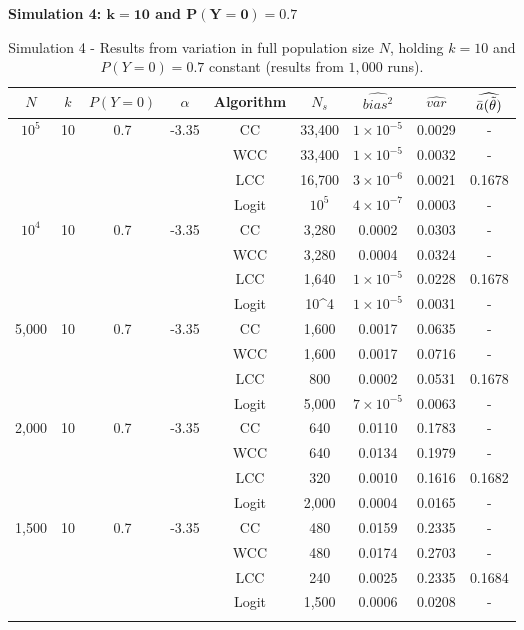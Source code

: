 \textbf{Simulation 4: $\mathbf{k=10}$ and $\mathbf{P(Y=0)=0.7}$}\\

\begin{longtable}{ccccccccc}
\toprule
$N$ & $k$ & $P(Y=0)$ & $\alpha$ & Algorithm & $N_s$ & $\widehat{bias^2}$ & $\widehat{var}$ & $\widehat{\Bar{a}(\Tilde{\theta})}$\\
\midrule
$10^5$ & 10 & 0.7 & -3.35 & CC & 33,400 & $1\times10^{-5}$ & 0.0029 & - \\
 & & & & WCC & 33,400 & $1\times10^{-5}$ & 0.0032 & - \\
 & & & & LCC & 16,700 & $3\times10^{-6}$ & 0.0021 & 0.1678\\
 & & & & Logit & $10^5$ & $4\times10^{-7}$ & 0.0003 & -\\
 \midrule
$10^4$ & 10 & 0.7 & -3.35 & CC & 3,280 & 0.0002 & 0.0303 & - \\
 & & & & WCC & 3,280 &  0.0004 & 0.0324 & - \\
 & & & & LCC & 1,640 & $1\times10^{-5}$ & 0.0228 & 0.1678 \\
 & & & & Logit & 10^4 & $1\times10^{-5}$ & 0.0031 & - \\
\midrule
5,000 & 10 & 0.7 & -3.35 & CC & 1,600 & 0.0017 & 0.0635 & - \\
 & & & & WCC & 1,600 & 0.0017 & 0.0716 & - \\
 & & & & LCC & 800 & 0.0002 & 0.0531 & 0.1678 \\
 & & & & Logit & 5,000 & $7\times10^{-5}$ & 0.0063 & - \\
 \midrule
2,000 & 10 & 0.7 & -3.35 & CC & 640 &0.0110 & 0.1783 & - \\
 & & & & WCC & 640 & 0.0134 & 0.1979 & - \\
 & & & & LCC & 320 & 0.0010 & 0.1616 & 0.1682 \\
 & & & & Logit & 2,000 & 0.0004 & 0.0165 & - \\
 \midrule
1,500 & 10 & 0.7 & -3.35 & CC & 480 & 0.0159 & 0.2335 & - \\
 & & & & WCC & 480 & 0.0174 & 0.2703 & -\\
 & & & & LCC & 240 & 0.0025 & 0.2335 & 0.1684 \\
 & & & & Logit & 1,500 & 0.0006 & 0.0208 & - \\
\bottomrule
\caption[Simulation 4 - Results from variation in full population size $N$, holding $k=10$ and $P(Y=0)=0.7$ constant]{Simulation 4 - Results from variation in full population size $N$, holding $k=10$ and $P(Y=0)=0.7$ constant (results from $1,000$ runs).}
\label{tab:sim4-0.7} 
\end{longtable}


